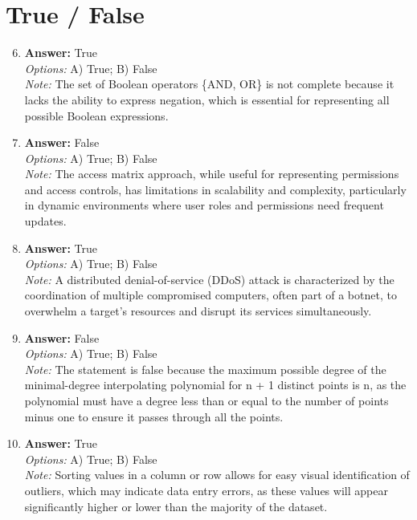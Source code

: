 \documentclass[12pt]{article}
\begin{document}
\section*{True / False}
\begin{enumerate}[label=\arabic*.]
\setcounter{enumi}{5}
\item \textbf{Answer:} True
\\ \textit{Options:} A) True; B) False
\\ \textit{Note:} The set of Boolean operators \{AND, OR\} is not complete because it lacks the ability to express negation, which is essential for representing all possible Boolean expressions.
\item \textbf{Answer:} False
\\ \textit{Options:} A) True; B) False
\\ \textit{Note:} The access matrix approach, while useful for representing permissions and access controls, has limitations in scalability and complexity, particularly in dynamic environments where user roles and permissions need frequent updates.
\item \textbf{Answer:} True
\\ \textit{Options:} A) True; B) False
\\ \textit{Note:} A distributed denial-of-service (DDoS) attack is characterized by the coordination of multiple compromised computers, often part of a botnet, to overwhelm a target's resources and disrupt its services simultaneously.
\item \textbf{Answer:} False
\\ \textit{Options:} A) True; B) False
\\ \textit{Note:} The statement is false because the maximum possible degree of the minimal-degree interpolating polynomial for n + 1 distinct points is n, as the polynomial must have a degree less than or equal to the number of points minus one to ensure it passes through all the points.
\item \textbf{Answer:} True
\\ \textit{Options:} A) True; B) False
\\ \textit{Note:} Sorting values in a column or row allows for easy visual identification of outliers, which may indicate data entry errors, as these values will appear significantly higher or lower than the majority of the dataset.
\end{enumerate}
\end{document}
